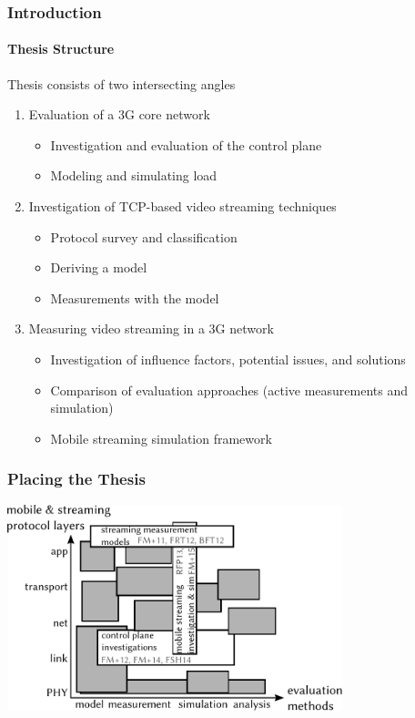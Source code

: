 \documentclass{beamer}
\begin{document}
\begin{frame}
	\frametitle{Introduction}
	\framesubtitle{Thesis Structure}

	Thesis consists of two intersecting angles
	\begin{enumerate}
		\item Evaluation of a 3G core network
			\begin{itemize}
				\item Investigation and evaluation of the control plane
				\item Modeling and simulating load
			\end{itemize}

		\item<2-> Investigation of TCP-based video streaming techniques
			\begin{itemize}[<2->]
				\item Protocol survey and classification
				\item Deriving a model
				\item Measurements with the model
			\end{itemize}

		\item<3-> Measuring video streaming in a 3G network 
			\begin{itemize}[<3->]
				\item Investigation of influence factors, potential issues, and solutions
				\item Comparison of evaluation approaches (active measurements and simulation)
				\item Mobile streaming simulation framework
			\end{itemize}
	\end{enumerate}


\end{frame}

\begin{frame}
	\frametitle{Placing the Thesis}

	\begin{center}
		\includegraphics[height=6cm]{extras/placement.pdf}
	\end{center}

\end{frame}
\end{document}
